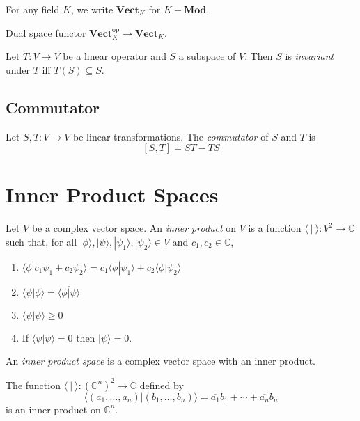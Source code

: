 \begin{df}
For any field $K$, we write $\mathbf{Vect}_K$ for $K-\mathbf{Mod}$.
\end{df}

Dual space functor $\mathbf{Vect}_K^{\mathrm{op}} \rightarrow \mathbf{Vect}_K$.

\begin{df}[Invariant]
Let $T : V \rightarrow V$ be a linear operator and $S$ a subspace of $V$. Then $S$ is \emph{invariant} under $T$ iff $T(S) \subseteq S$.
\end{df}

\subsection{Commutator}

\begin{df}[Commutator]
Let $S,T : V \rightarrow V$ be linear transformations. The \emph{commutator} of $S$ and $T$ is
\[ [S,T] = ST - TS \]
\end{df}

\section{Inner Product Spaces}

\begin{df}
Let $V$ be a complex vector space. An \emph{inner product} on $V$ is a function $\langle \ | \ \rangle : V^2 \rightarrow \mathbb{C}$ such that, for all $|\phi\rangle, |\psi\rangle, |\psi_1 \rangle, | \psi_2 \rangle \in V$ and $c_1, c_2 \in \mathbb{C}$,
\begin{enumerate}
\item $\langle \phi | c_1 \psi_1 + c_2 \psi_2 \rangle = c_1 \langle \phi | \psi_1 \rangle + c_2 \langle \phi | \psi_2 \rangle$
\item $\langle \psi | \phi \rangle = \overline{\langle \phi | \psi \rangle}$
\item $\langle \psi | \psi \rangle \geq 0$
\item If $\langle \psi | \psi \rangle = 0$ then $|\psi\rangle = 0$.
\end{enumerate}

An \emph{inner product space} is a complex vector space with an inner product.
\end{df}

\begin{ex}
The function $\langle \ | \ \rangle : (\mathbb{C}^n)^2 \rightarrow \mathbb{C}$ defined by
\[ \langle (a_1, \ldots, a_n) | (b_1, \ldots, b_n) \rangle = \overline{a_1} b_1 + \cdots + \overline{a_n} b_n \]
is an inner product on $\mathbb{C}^n$.
\end{ex}

